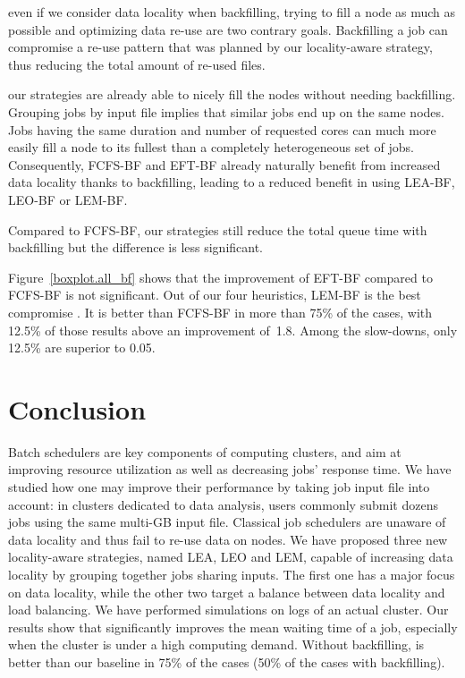 \documentclass[sigconf,review,anonymous]{acmart}
\newcommand{\rev}[1]{{\color{black}{#1}}}
\begin{document}
\rev{Firstly,} even if we consider data locality when backfilling, trying to fill a node as much as possible and optimizing data re-use are two contrary goals. 
Backfilling a job can compromise a re-use pattern that was planned by our locality-aware strategy,
thus reducing the total amount of re-used files.

\rev{Secondly,} our strategies are already able to nicely fill the nodes without needing backfilling.
Grouping jobs by input file implies that similar jobs end up on the same nodes.
Jobs having the same duration and number of requested cores can much more easily fill a node to its fullest than a completely heterogeneous set of jobs.
Consequently, FCFS-BF and EFT-BF already naturally benefit from increased data locality thanks to backfilling, leading to a reduced benefit in using LEA-BF, LEO-BF or LEM-BF.

Compared to FCFS-BF, our strategies still reduce the total queue time with backfilling but the difference is less significant.

Figure~\ref{boxplot.all_bf} shows that the improvement of EFT-BF compared to FCFS-BF is not significant.
Out of our four heuristics, LEM-BF is the best compromise \rev{here}.
It is better than FCFS-BF in more than 75\% of the cases, 
with 12.5\% of those results above an improvement of~1.8.
Among the slow-downs, only 12.5\% are superior to 0.05.

\section{Conclusion}\label{sec.conclusion}

Batch schedulers are key components of computing clusters, and aim at
improving resource utilization as well as decreasing jobs' response
time. We have studied how one may improve their performance by taking
job input file into account: in clusters dedicated to data analysis,
users commonly submit dozens jobs using the same multi-GB input
file. Classical job schedulers are unaware of data locality and thus
fail to re-use data on nodes. We have proposed three new locality-aware
strategies, named LEA, LEO and LEM,
capable of increasing data locality by grouping together 
jobs sharing inputs. The first one has a major focus on data locality,
while the other two target a balance between data locality and load
balancing. We have performed simulations on logs of an actual
cluster. Our results show that \rev{LEA} significantly improves the mean
waiting time of a job, especially  
when the cluster is under a high computing demand.
Without backfilling, \rev{LEA} is better than our baseline in 75\% of the
cases (50\% of the cases with backfilling).
\rev{Our strategy called LEM is the best compromise. LEM is better than the baseline in more than 75\% of the cases with or without backfilling
(with a median improvement of 7.5\% compared to our baseline without backfilling).}
\end{document}
